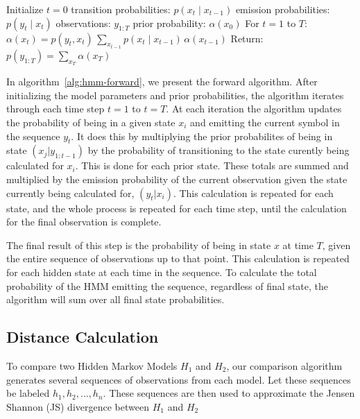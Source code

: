 \begin{algorithm}
\caption{Forward Algorithm for HMM}
\label{alg:hmm-forward}
    \begin{algorithmic}[1]
        \State Initialize
        \State \quad $t = 0$
        \State \quad transition probabilities: $p(x_t \mid x_{t-1})$
        \State \quad emission probabilities: $p(y_t \mid x_t)$
        \State \quad observations: $y_{1:T}$
        \State \quad prior probability: $\alpha(x_0)$
        \vspace{0.5em}
        \State For $t = 1$ to $T$:
        \vspace{0.5em}
        \State \quad $\alpha(x_t) = p(y_t,x_t)\,\displaystyle\sum_{x_{t-1}} p(x_t \mid x_{t-1})\,\alpha(x_{t-1})$
        \vspace{0.5em}
        \State Return: $p(y_{1:T}) = \displaystyle\sum_{x_T}\alpha(x_T)$
    \end{algorithmic}
\end{algorithm}

In algorithm~\ref{alg:hmm-forward}, we present the forward algorithm. After initializing the model parameters and prior probabilities,
the algorithm iterates through each time step $t=1$  to $t=T$. At each iteration the algorithm updates the probability of being in a given state $x_i$ and emitting the current symbol in the sequence $y_t$.
It does this by multiplying the prior probabilites of being in state $(x_{j} | y_{1:t-1})$ by the probability of 
transitioning to the state curently being calculated for $x_i$. This is done for each prior state. These totals are summed and multiplied by the emission probability of the current observation 
given the state currently being calculated for, $(y_t | x_i)$. This calculation is repeated for each state, and the whole process
is repeated for each time step, until the calculation for the final observation is complete.

The final result of this step is the probability of being in state $x$ at time $T$, given the entire sequence of observations up to that point.
This calculation is repeated for each hidden state at each time in the sequence. 
To calculate the total probability of the HMM emitting the sequence, regardless of final state, the algorithm will sum over all final state probabilities. 

\subsection{Distance Calculation}
To compare two Hidden Markov Models $H_1$ and $H_2$, our comparison algorithm generates several sequences of
observations from each model. Let these sequences be labeled
$h_1, h_2, \ldots, h_n$. 
These sequences are then used to approximate the Jensen Shannon (JS) divergence between $H_1$ and $H_2$


